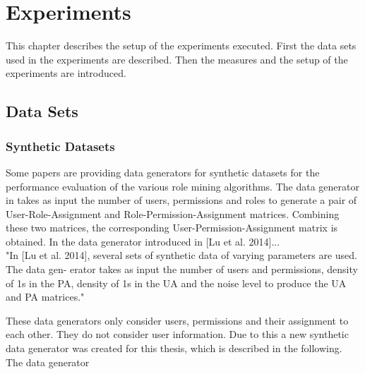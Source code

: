 \newpage
\section{Experiments}
This chapter describes the setup of the experiments executed. First the data sets used in the experiments are described. Then the measures and the setup of the experiments are introduced.

\subsection{Data Sets}
\subsubsection{Synthetic Datasets}
Some papers are providing data generators for synthetic datasets for the performance evaluation of the various role mining algorithms. The data generator in \cite{Vaidya:2006:RMR:1180405.1180424} takes as input the number of users, permissions and roles to generate a pair of User-Role-Assignment and Role-Permission-Assignment matrices. Combining these two matrices, the corresponding User-Permission-Assignment matrix is obtained.
In the data generator introduced in [Lu et al. 2014]...\\
"In [Lu et al. 2014], several sets of synthetic data of varying parameters are used. The data gen- erator takes as input the number of users and permissions, density of 1s in the PA, density of 1s in the UA and the noise level to produce the UA and PA matrices."

These data generators only consider users, permissions and their assignment to each other. They do not consider user information. Due to this a new synthetic data generator was created for this thesis, which is described in the following.
The data generator 

